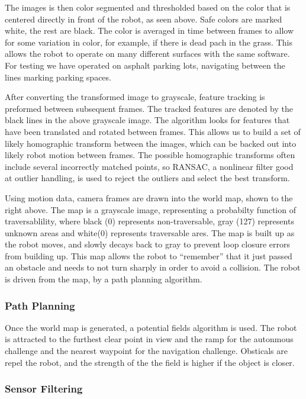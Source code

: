The images is then color segmented and thresholded based on the color that is centered directly in front of the robot, as seen above. Safe colors are marked white, the rest are black. The color is averaged in time between frames to allow for some variation in color, for example, if there is dead pach in the grass. This allows the robot to operate on many different surfaces with the same software. For testing we have operated on asphalt parking lots, navigating between the lines marking parking spaces.

After converting the transformed image to grayscale, feature tracking is preformed between subsequent frames. The tracked features are denoted by the black lines in the above grayscale image. The algorithm looks for features that have been translated and rotated between frames. This allows us to build a set of likely homographic transform between the images, which can be backed out into likely robot motion between frames. The possible homographic transforms often include several incorrectly matched points, so RANSAC, a nonlinear filter good at outlier handling, is used to reject the outliers and select the best transform.

Using motion data, camera frames are drawn into the world map, shown to the right above. The map is a grayscale image, representing a probabilty function of traversablility, where black (0) represents non-traversable, gray (127) represents unknown areas and white(0) represents traversable ares. The map is built up as the robot moves, and slowly decays back to gray to prevent loop closure errors from building up. This map allows the robot to “remember” that it just passed an obstacle and needs to not turn sharply in order to avoid a collision. The robot is driven from the map, by a path planning algorithm.

\subsubsection{Path Planning}

Once the world map is generated, a potential fields algorithm is used. The robot is attracted to the furthest clear point in view and the ramp for the autonmous challenge and the nearest waypoint for the navigation challenge. Obsticals are repel the robot, and the strength of the the field is higher if the object is closer.

\subsubsection{Sensor Filtering}

